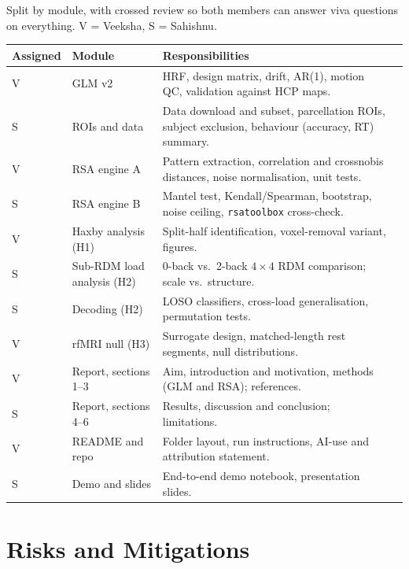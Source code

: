\documentclass[11pt,a4paper]{article}
\begin{document}
Split by module, with crossed review so both members can answer viva questions on everything. V = Veeksha, S = Sahishnu.

\begin{xltabular}{\linewidth}{@{}p{1.5cm}p{3.6cm}Yp{1.6cm}@{}}
\toprule
\textbf{Assigned} & \textbf{Module} & \textbf{Responsibilities}\\
\midrule
\endhead
V & GLM v2 & HRF, design matrix, drift, AR(1), motion QC, validation against HCP maps.\\
S & ROIs and data & Data download and subset, parcellation ROIs, subject exclusion, behaviour (accuracy, RT) summary.\\
V & RSA engine A & Pattern extraction, correlation and crossnobis distances, noise normalisation, unit tests.\\
S & RSA engine B & Mantel test, Kendall/Spearman, bootstrap, noise ceiling, \texttt{rsatoolbox} cross-check.\\
V & Haxby analysis (H1) & Split-half identification, voxel-removal variant, figures.\\
S & Sub-RDM load analysis (H2) & 0-back vs.\ 2-back $4\times4$ RDM comparison; scale vs.\ structure.\\
S & Decoding (H2) & LOSO classifiers, cross-load generalisation, permutation tests.\\
V & rfMRI null (H3) & Surrogate design, matched-length rest segments, null distributions.\\
V & Report, sections 1--3 & Aim, introduction and motivation, methods (GLM and RSA); references.\\
S & Report, sections 4--6 & Results, discussion and conclusion; limitations.\\
V & README and repo & Folder layout, run instructions, AI-use and attribution statement.\\
S & Demo and slides & End-to-end demo notebook, presentation slides.\\
\bottomrule
\end{xltabular}

\section{Risks and Mitigations}
\end{document}
